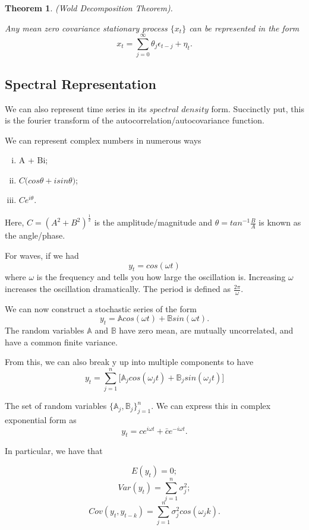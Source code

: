 \documentclass[twoside]{article}
\newcounter{lecnum}
\newtheorem{theorem}{Theorem}[lecnum]
\begin{document}
\begin{theorem}(Wold Decomposition Theorem).

Any mean zero covariance stationary process $\{x_t\}$ can be represented in the form
$$
x_t = \sum_{j=0}^{\infty}\theta_j\epsilon_{t-j} + \eta_t.
$$

\end{theorem}

\subsection{Spectral Representation}
We can also represent time series in its $\textit{spectral density}$ form. Succinctly put, this is the fourier transform of the autocorrelation/autocovariance function.

We can represent complex numbers in numerous ways

\begin{enumerate}[(i)]
  \item A + Bi;
  \item $C\big(cos \theta + isin\theta\big)$;
  \item $Ce^{i\theta}$.
\end{enumerate}

Here, $C = (A^2 + B^2)^{\frac{1}{2}}$ is the amplitude/magnitude and $\theta = tan^{-1}\frac{B}{A}$ is known as the angle/phase.

\bigskip

For waves, if we had
$$
y_t = cos(\omega t)
$$
where $\omega$ is the frequency and tells you how large the oscillation is. Increasing $\omega$ increases the oscillation dramatically. The period is defined as $\frac{2\pi}{\omega}$. 

We can now construct a stochastic series of the form
$$
y_t = \mathbb{A}cos(\omega t) + \mathbb{B}sin(\omega t).
$$
The random variables $\mathbb{A}$ and $\mathbb{B}$ have zero mean, are mutually uncorrelated, and have a common finite variance.

From this, we can also break y up into multiple components to have
$$
y_t = \sum_{j=1}^n\big[\mathbb{A}_jcos(\omega_jt) + \mathbb{B}_jsin(\omega_jt)\big]
$$

The set of random variables $\{\mathbb{A}_j, \mathbb{B}_j\}_{j=1}^n$. We can express this in complex exponential form as
$$
y_t = ce^{i\omega t} + \bar{c}e^{-i\omega t}.
$$

In particular, we have that

$$
E(y_t) = 0;
$$
$$
Var(y_t) = \sum_{j=1}^n\sigma_j^2;
$$
$$
Cov(y_t, y_{t-k}) = \sum_{j=1}^n\sigma_j^2cos(\omega_jk).
$$
\end{document}
